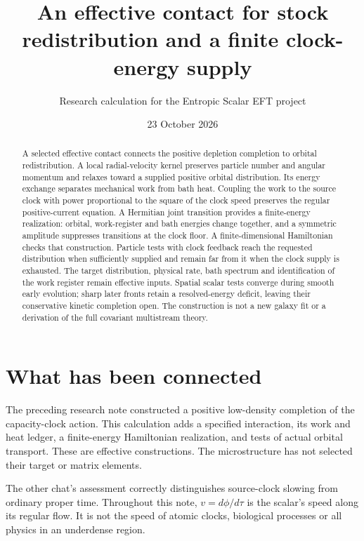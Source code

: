 \documentclass[11pt]{article}
\title{An effective contact for stock redistribution and a finite clock-energy supply}
\author{Research calculation for the Entropic Scalar EFT project}
\date{23 October 2026}
\begin{document}
\maketitle
\begin{abstract}
A selected effective contact connects the positive depletion completion to
orbital redistribution. A local radial-velocity kernel preserves particle
number and angular momentum and relaxes toward a supplied positive orbital
distribution. Its energy exchange separates mechanical work from bath heat.
Coupling the work to the source clock with power proportional to the square
of the clock speed preserves the regular positive-current equation. A
Hermitian joint transition provides a finite-energy realization: orbital,
work-register and bath energies change together, and a symmetric amplitude
suppresses transitions at the clock floor. A finite-dimensional Hamiltonian
checks that construction. Particle tests with clock feedback reach the
requested distribution when sufficiently supplied and remain far from it
when the clock supply is exhausted. The target distribution, physical rate,
bath spectrum and identification of the work register remain effective inputs.
Spatial scalar tests converge during smooth early evolution; sharp later
fronts retain a resolved-energy deficit, leaving their conservative kinetic
completion open. The construction is not a new galaxy fit or a derivation of
the full covariant multistream theory.
\end{abstract}

\section{What has been connected}
The preceding research note constructed a positive low-density completion
of the capacity-clock action. This calculation adds a specified interaction,
its work and heat ledger, a finite-energy Hamiltonian realization, and tests
of actual orbital transport. These are effective constructions. The
microstructure has not selected their target or matrix elements.

The other chat's assessment correctly distinguishes source-clock slowing
from ordinary proper time. Throughout this note, $v=d\phi/d\tau$ is the
scalar's speed along its regular flow. It is not the speed of atomic clocks,
biological processes or all physics in an underdense region.
\end{document}
